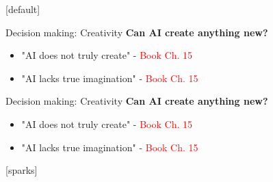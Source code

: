 \documentclass[8pt]{beamer}
\begin{document}
	[default]

	\begin{frame}[t]{Decision making: Creativity}
		\textbf{Can AI create anything new?}
		\begin{itemize}
			\item "AI does not truly create" - \textcolor{red}{Book Ch. 15}
			\item "AI lacks true imagination" - \textcolor{red}{Book Ch. 15}
		\end{itemize}
	\end{frame}

	\begin{frame}[t]{Decision making: Creativity}
		\textbf{Can AI create anything new?}
		\begin{itemize}
			\item "AI does not truly create" - \textcolor{red}{Book Ch. 15}
			\item "AI lacks true imagination" - \textcolor{red}{Book Ch. 15}
		\end{itemize}
		\centering
		\vspace{0.5cm}
	\end{frame}

	[sparks]
\end{document}
